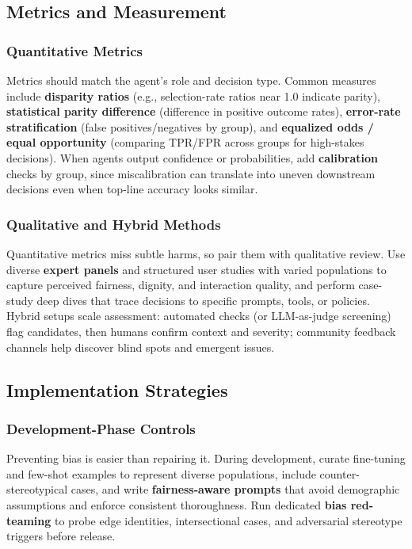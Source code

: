 \begin{TNtwocol}
\subsection*{Metrics and Measurement}

\subsubsection*{Quantitative Metrics}
Metrics should match the agent's role and decision type. Common measures include \textbf{disparity ratios} (e.g., selection-rate ratios near 1.0 indicate parity), \textbf{statistical parity difference} (difference in positive outcome rates), \textbf{error-rate stratification} (false positives/negatives by group), and \textbf{equalized odds / equal opportunity} (comparing TPR/FPR across groups for high-stakes decisions). When agents output confidence or probabilities, add \textbf{calibration} checks by group, since miscalibration can translate into uneven downstream decisions even when top-line accuracy looks similar.

\subsubsection*{Qualitative and Hybrid Methods}
Quantitative metrics miss subtle harms, so pair them with qualitative review. Use diverse \textbf{expert panels} and structured user studies with varied populations to capture perceived fairness, dignity, and interaction quality, and perform case-study deep dives that trace decisions to specific prompts, tools, or policies. Hybrid setups scale assessment: automated checks (or LLM-as-judge screening) flag candidates, then humans confirm context and severity; community feedback channels help discover blind spots and emergent issues.

\subsection*{Implementation Strategies}

\subsubsection*{Development-Phase Controls}
Preventing bias is easier than repairing it. During development, curate fine-tuning and few-shot examples to represent diverse populations, include counter-stereotypical cases, and write \textbf{fairness-aware prompts} that avoid demographic assumptions and enforce consistent thoroughness. Run dedicated \textbf{bias red-teaming} to probe edge identities, intersectional cases, and adversarial stereotype triggers before release.


\end{TNtwocol}
